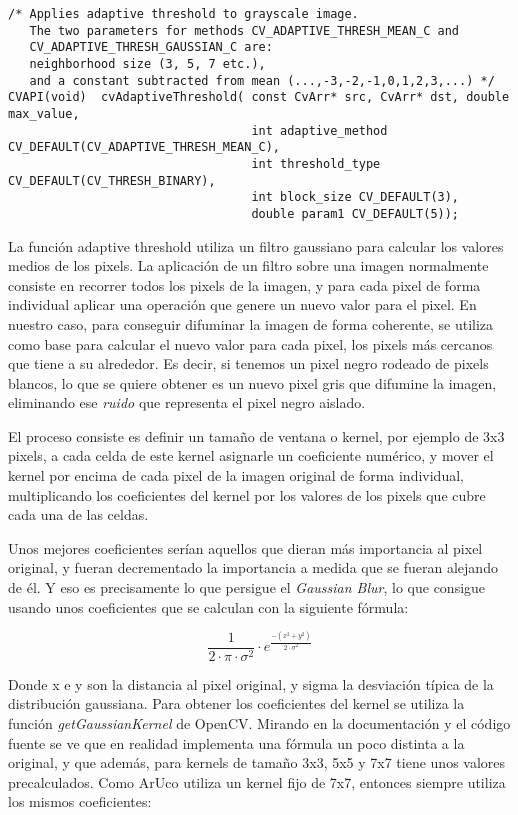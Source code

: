 \documentclass[10pt,a4paper]{article}
\begin{document}
\begin{lstlisting}[style=C++]
/* Applies adaptive threshold to grayscale image.
   The two parameters for methods CV_ADAPTIVE_THRESH_MEAN_C and
   CV_ADAPTIVE_THRESH_GAUSSIAN_C are:
   neighborhood size (3, 5, 7 etc.),
   and a constant subtracted from mean (...,-3,-2,-1,0,1,2,3,...) */
CVAPI(void)  cvAdaptiveThreshold( const CvArr* src, CvArr* dst, double max_value,
                                  int adaptive_method CV_DEFAULT(CV_ADAPTIVE_THRESH_MEAN_C),
                                  int threshold_type CV_DEFAULT(CV_THRESH_BINARY),
                                  int block_size CV_DEFAULT(3),
                                  double param1 CV_DEFAULT(5));
\end{lstlisting} 

La función adaptive threshold utiliza un filtro gaussiano para calcular los valores medios de los pixels. La aplicación de un filtro sobre una imagen normalmente consiste en recorrer todos los pixels de la imagen, y para cada pixel de forma individual aplicar una operación que genere un nuevo valor para el pixel. En nuestro caso, para conseguir difuminar la imagen de forma coherente, se utiliza como base para calcular el nuevo valor para cada pixel, los pixels más cercanos que tiene a su alrededor. Es decir, si tenemos un pixel negro rodeado de pixels blancos, lo que se quiere obtener es un nuevo pixel gris que difumine la imagen, eliminando ese \textit{ruido} que representa el pixel negro aislado.

El proceso consiste es definir un tamaño de ventana o kernel, por ejemplo de 3x3 pixels, a cada celda de este kernel asignarle un coeficiente numérico, y mover el kernel por encima de cada pixel de la imagen original de forma individual, multiplicando los coeficientes del kernel por los valores de los pixels que cubre cada una de las celdas.

Unos mejores coeficientes serían aquellos que dieran más importancia al pixel original, y fueran decrementado la importancia a medida que se fueran alejando de él. Y eso es precisamente lo que persigue el \textit{Gaussian Blur}, lo que consigue usando unos coeficientes que se calculan con la siguiente fórmula:

\begin{equation}
\frac{1}{2 \cdot \pi \cdot \sigma^{2}} \cdot e^{\frac{-(x^2 + y^2)}{2 \cdot \sigma^{2}}}
\end{equation}

Donde x e y son la distancia al pixel original, y sigma la desviación típica de la distribución gaussiana.
Para obtener los coeficientes del kernel se utiliza la función \textit{getGaussianKernel} de OpenCV. Mirando en la documentación y el código fuente se ve que en realidad implementa una fórmula un poco distinta a la original, y que además, para kernels de tamaño 3x3, 5x5 y 7x7 tiene unos valores precalculados.
Como ArUco utiliza un kernel fijo de 7x7, entonces siempre utiliza los mismos coeficientes:
\end{document}
